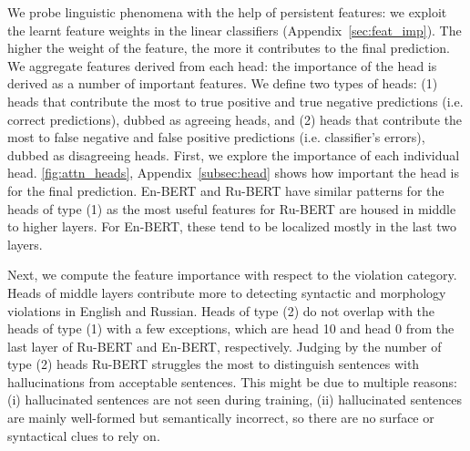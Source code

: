 \documentclass[11pt]{article}
\begin{document}
We probe linguistic phenomena with the help of persistent features: we exploit the learnt feature weights in the linear classifiers (Appendix~\ref{sec:feat_imp}). The higher the weight of the feature, the more it contributes to the final prediction. We aggregate features derived from each head: the importance of the head is derived as a number of important features.
We define two types of heads: (1) heads that  contribute the most to true positive and true negative predictions (i.e. correct predictions), dubbed as agreeing heads, and (2)  heads that contribute the most to false negative and false positive predictions (i.e. classifier's errors), dubbed as disagreeing heads. 
First, we explore the importance of each individual head. \autoref{fig:attn_heads}, Appendix~\ref{subsec:head} shows how important the head is for the final prediction. 
En-BERT and Ru-BERT have similar patterns for the heads of type (1) as the most useful features for Ru-BERT are housed in middle to higher layers. 
For En-BERT, these tend to be localized mostly in the last two layers. 



Next, we compute the feature importance with respect to the violation category.  
Heads of middle layers contribute more to detecting syntactic and morphology violations in English and Russian.
Heads of type (2) do not overlap with the heads of type (1) with a few exceptions, which are head 10 and head 0 from the last layer of Ru-BERT and En-BERT, respectively.
Judging by the number of type (2) heads Ru-BERT struggles the most to distinguish sentences with hallucinations from acceptable sentences. This might be due to multiple reasons: (i) hallucinated sentences are not seen during training, (ii) hallucinated sentences are mainly well-formed but semantically incorrect, so there are no surface or syntactical clues to rely on. 
\end{document}
